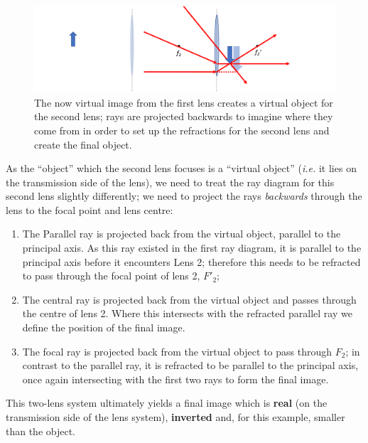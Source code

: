 \documentclass[
]{book}
\providecommand{\tightlist}{%
  \setlength{\itemsep}{0pt}\setlength{\parskip}{0pt}}
\begin{document}
\begin{figure}

{\centering \includegraphics[width=0.7\linewidth]{visualisations/LaTeX/ch16-convergingset2a} 

}

\caption{The now virtual image from the first lens creates a virtual object for the second lens; rays are projected backwards to imagine where they come from in order to set up the refractions for the second lens and create the final object.}\label{fig:ch16-convergingset2a}
\end{figure}

As the ``object'' which the second lens focuses is a ``virtual object'' (\emph{i.e.} it lies on the transmission side of the lens), we need to treat the ray diagram for this second lens slightly differently; we need to project the rays \emph{backwards} through the lens to the focal point and lens centre:

\begin{enumerate}
\def\labelenumi{\arabic{enumi}.}
\tightlist
\item
  The Parallel ray is projected back from the virtual object, parallel to the principal axis. As this ray existed in the first ray diagram, it is parallel to the principal axis before it encounters Lens 2; therefore this needs to be refracted to pass through the focal point of lens 2, \(F'_2\);
\item
  The central ray is projected back from the virtual object and passes through the centre of lens 2. Where this intersects with the refracted parallel ray we define the position of the final image.
\item
  The focal ray is projected back from the virtual object to pass through \(F_2\); in contrast to the parallel ray, it is refracted to be parallel to the principal axis, once again intersecting with the first two rays to form the final image.
\end{enumerate}

This two-lens system ultimately yields a final image which is \textbf{real} (on the transmission side of the lens system), \textbf{inverted} and, for this example, smaller than the object.
\end{document}

